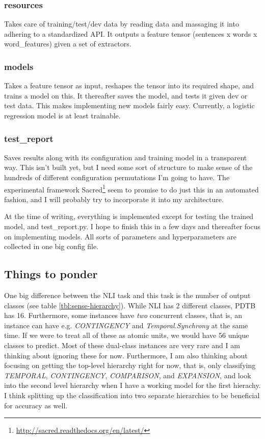 \subsubsection{resources} Takes care of training/test/dev data by reading data and massaging it into adhering to a standardized API. It outputs a feature tensor (sentences x words x word\_features) given a set of extractors.

\subsubsection{models} Takes a feature tensor as input, reshapes the tensor into its required shape, and trains a model on this. It thereafter saves the model, and tests it given dev or test data. This makes implementing new models fairly easy. Currently, a logistic regression model is at least trainable.

\subsubsection{test\_report} Saves results along with its configuration and training model in a transparent way. This isn't built yet, but I need some sort of structure to make sense of the hundreds of different configuration permutations I'm going to have. The experimental framework Sacred\footnote{\url{http://sacred.readthedocs.org/en/latest/}} seem to promise to do just this in an automated fashion, and I will probably try to incorporate it into my architecture.

At the time of writing, everything is implemented except for testing the trained model, and test\_report.py. I hope to finish this in a few days and thereafter focus on implementing models. All sorts of parameters and hyperparameters are collected in one big config file.


\subsection{Things to ponder}

One big difference between the NLI task and this task is the number of output classes (see table \ref{tbl:sense-hierarchy}). While NLI has 2 different classes, PDTB has 16. Furthermore, some instances have \emph{two} concurrent classes, that is, an instance can have e.g. \emph{CONTINGENCY} and \emph{Temporal.Synchrony} at the same time. If we were to treat all of these as atomic units, we would have 56 unique classes to predict. Most of these dual-class instances are very rare and I am thinking about ignoring these for now. Furthermore, I am also thinking about focusing on getting the top-level hierarchy right for now, that is, only classifying \emph{TEMPORAL}, \emph{CONTINGENCY}, \emph{COMPARISON}, and \emph{EXPANSION}, and look into the second level hierarchy when I have a working model for the first hierachy. I think splitting up the classification into two separate hierarchies to be beneficial for accuracy as well.


